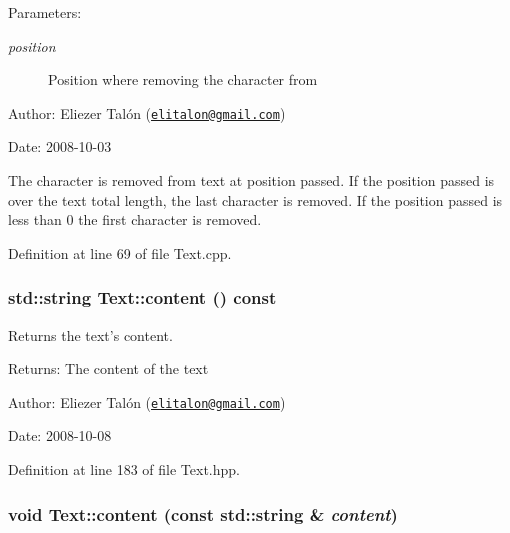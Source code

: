\begin{Desc}
\item[Parameters:]
\begin{description}
\item[{\em position}]Position where removing the character from\end{description}
\end{Desc}
\begin{Desc}
\item[Author:]Eliezer Talón (\href{mailto:elitalon@gmail.com}{\tt elitalon@gmail.com}) \end{Desc}
\begin{Desc}
\item[Date:]2008-10-03\end{Desc}
The character is removed from text at position passed. If the position passed is over the text total length, the last character is removed. If the position passed is less than 0 the first character is removed. 

Definition at line 69 of file Text.cpp.\hypertarget{class_text_58a34fa2cfd0c240a7517132017b6a83}{
\subsubsection[content]{\setlength{\rightskip}{0pt plus 5cm}std::string Text::content () const}}
\label{class_text_58a34fa2cfd0c240a7517132017b6a83}


Returns the text's content. 

\begin{Desc}
\item[Returns:]The content of the text\end{Desc}
\begin{Desc}
\item[Author:]Eliezer Talón (\href{mailto:elitalon@gmail.com}{\tt elitalon@gmail.com}) \end{Desc}
\begin{Desc}
\item[Date:]2008-10-08 \end{Desc}


Definition at line 183 of file Text.hpp.\hypertarget{class_text_eca454f28010b6b3e7bd0d771b8eaeb2}{
\subsubsection[content]{\setlength{\rightskip}{0pt plus 5cm}void Text::content (const std::string \& {\em content})}}
\label{class_text_eca454f28010b6b3e7bd0d771b8eaeb2}


